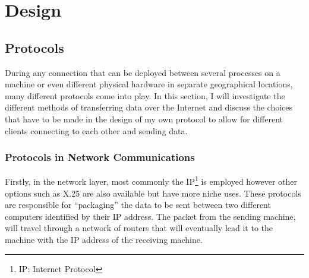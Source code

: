 \chapter{Design}

\section{Protocols}
During any connection that can be deployed between several processes on a machine or even different physical hardware in separate geographical locations, many different protocols come into play. In this section, I will investigate the different methods of transferring data over the Internet and discuss the choices that have to be made in the design of my own protocol to allow for different clients connecting to each other and sending data.

\subsection{Protocols in Network Communications}
Firstly, in the network layer, most commonly the IP\footnote{IP: Internet Protocol} is employed however other options such as X.25 are also available but have more niche uses. These protocols are responsible for ``packaging'' the data to be sent between two different computers identified by their IP address. The packet from the sending machine, will travel through a network of routers that will eventually lead it to the machine with the IP address of the receiving machine.

